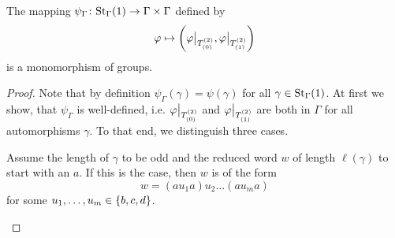 \begin{lem}\label{thm:psi Gamma}
The mapping $\psi_\Gamma\colon\St[\Gamma]{1}\to\Gamma\times\Gamma$ defined by
\begin{equation*}
\varphi\mapsto\left(\varphi\big\vert_{\ST{(0)}},\varphi\big\vert_{\ST{(1)}}\right)
\end{equation*}
is a monomorphism of groups.
\end{lem}
\begin{proof}
Note that by definition $\psi_\Gamma(\gamma)=\psi(\gamma)$ for all $\gamma\in\St[\Gamma]{1}$. At first we show, that $\psi_\Gamma$ is well-defined, i.e. $\varphi\big\vert_{\ST{(0)}}$ and $\varphi\big\vert_{\ST{(1)}}$ are both in $\Gamma$ for all automorphisms $\gamma$. To that end, we distinguish three cases.
\begin{clist}
\item Assume the length of $\gamma$ to be odd and the reduced word $w$ of length $\ell(\gamma)$ to start with an $a$. If this is the case, then $w$ is of the form
\begin{equation*}
w=(au_1a)u_2\ldots (au_ma)
\end{equation*}
for some $\seq[m]{u}\in\lbrace b,c,d\rbrace$.


\end{clist}
\end{proof}
